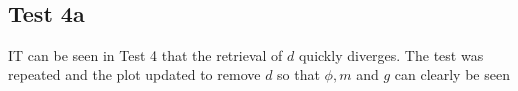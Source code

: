 \documentclass{article}
\begin{document}
    \begin{center}
    \end{center}
    { \hspace*{\fill} \\}
    
    \subsection{}\label{section}

\subsection{Test 4a}\label{test-4a}

IT can be seen in Test 4 that the retrieval of $d$ quickly diverges. The
test was repeated and the plot updated to remove $d$ so that $\phi, m$
and $g$ can clearly be seen
\end{document}
